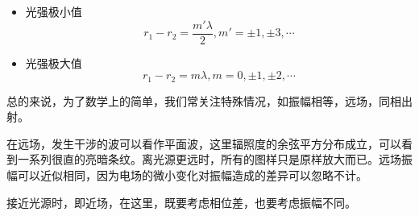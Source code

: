 \begin{corollary}{}

\begin{itemize}
\item 光强极小值 
\begin{equation}
r_1 - r_2 = \dfrac{ m' \lambda} { 2 } , m' = \pm 1, \pm 3, \cdots
\end{equation}

\item 光强极大值 
\begin{equation}
 r_1 - r_2 = m \lambda , m = 0 , \pm 1, \pm 2,\cdots 
\end{equation}

\end{itemize}

\end{corollary}


总的来说，为了数学上的简单，我们常关注特殊情况，如振幅相等，远场，同相出射。

在远场，发生干涉的波可以看作平面波，这里辐照度的余弦平方分布成立，可以看到一系列很直的亮暗条纹。离光源更远时，所有的图样只是原样放大而已。远场振幅可以近似相同，因为电场的微小变化对振幅造成的差异可以忽略不计。

接近光源时，即近场，在这里，既要考虑相位差，也要考虑振幅不同。








